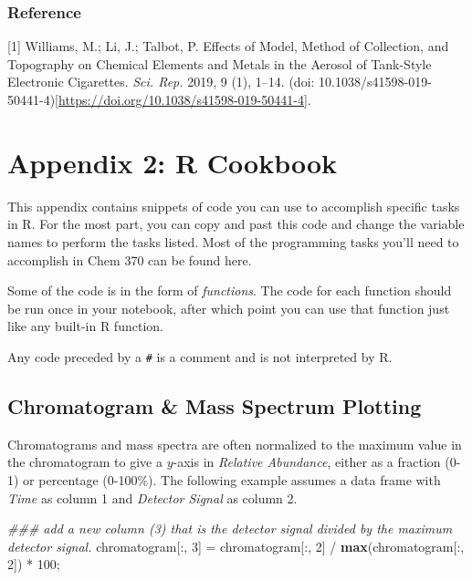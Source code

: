 \documentclass[]{tufte-book}
\newenvironment{Shaded}{}{}
\newcommand{\CommentTok}[1]{\textcolor[rgb]{0.38,0.63,0.69}{\textit{#1}}}
\newcommand{\DecValTok}[1]{\textcolor[rgb]{0.25,0.63,0.44}{#1}}
\newcommand{\KeywordTok}[1]{\textcolor[rgb]{0.00,0.44,0.13}{\textbf{#1}}}
\newcommand{\NormalTok}[1]{#1}
\newcommand{\OperatorTok}[1]{\textcolor[rgb]{0.40,0.40,0.40}{#1}}
\newcommand{\StringTok}[1]{\textcolor[rgb]{0.25,0.44,0.63}{#1}}
\begin{document}
\hypertarget{reference}{%
\subsection{Reference}\label{reference}}

{[}1{]} Williams, M.; Li, J.; Talbot, P. Effects of Model, Method of Collection, and Topography on Chemical Elements and Metals in the Aerosol of Tank-Style Electronic Cigarettes. \emph{Sci. Rep.} 2019, 9 (1), 1--14. (doi: 10.1038/s41598-019-50441-4){[}\url{https://doi.org/10.1038/s41598-019-50441-4}{]}.

\hypertarget{appendix-2-r-cookbook}{%
\chapter*{Appendix 2: R Cookbook}\label{appendix-2-r-cookbook}}

This appendix contains snippets of code you can use to accomplish specific tasks in R. For the most part, you can copy and past this code and change the variable names to perform the tasks listed. Most of the programming tasks you'll need to accomplish in Chem 370 can be found here.

Some of the code is in the form of \emph{functions}. The code for each function should be run once in your notebook, after which point you can use that function just like any built-in R function.

Any code preceded by a \texttt{\#} is a comment and is not interpreted by R.

\hypertarget{chromatogram-mass-spectrum-plotting}{%
\section*{Chromatogram \& Mass Spectrum Plotting}\label{chromatogram-mass-spectrum-plotting}}

Chromatograms and mass spectra are often normalized to the maximum value in the chromatogram to give a \(y\)-axis in \emph{Relative Abundance}, either as a fraction (0-1) or percentage (0-100\%). The following example assumes a data frame with \emph{Time} as column 1 and \emph{Detector Signal} as column 2.

\begin{Shaded}
\begin{Highlighting}[]
\CommentTok{### add a new column (3) that is the detector signal divided by the maximum detector signal.}
\NormalTok{chromatogram[}\OperatorTok{:}\NormalTok{, }\DecValTok{3}\NormalTok{] =}\StringTok{ }\NormalTok{chromatogram[}\OperatorTok{:}\NormalTok{, }\DecValTok{2}\NormalTok{] }\OperatorTok{/}\StringTok{ }\KeywordTok{max}\NormalTok{(chromatogram[}\OperatorTok{:}\NormalTok{, }\DecValTok{2}\NormalTok{]) }\OperatorTok{*}\StringTok{ }\DecValTok{100}\NormalTok{;}
\end{Highlighting}
\end{Shaded}
\end{document}
